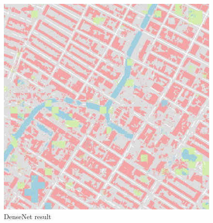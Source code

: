 \documentclass[]{IEEEtran}
\begin{document}
\begin{figure}[!hbt]
\begin{center}
\begin{minipage}[t]{0.21\textwidth}
			\includegraphics[width=\columnwidth]{dense_out}
			\caption{DenseNet result}
			\label{fig:dense}
		\end{minipage}
	\end{center}
\end{figure}
\end{document}
